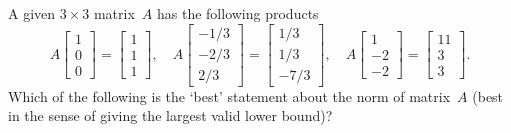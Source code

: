\begin{activity}
A given \(3\times3\) matrix~\(A\) has the following products
\begin{equation*}
A\begin{bmatrix} 1\\0\\0 \end{bmatrix}
=\begin{bmatrix} 1\\1\\1 \end{bmatrix},\quad
A\begin{bmatrix} -1/3\\-2/3\\2/3 \end{bmatrix}
=\begin{bmatrix} 1/3\\1/3\\-7/3 \end{bmatrix},\quad
A\begin{bmatrix} 1\\-2\\-2 \end{bmatrix}
=\begin{bmatrix} 11\\3\\3 \end{bmatrix}.
\end{equation*}
Which of the following is the `best' statement about the norm of matrix~\(A\) (best in the sense of giving the largest valid lower bound)?
\end{activity}




